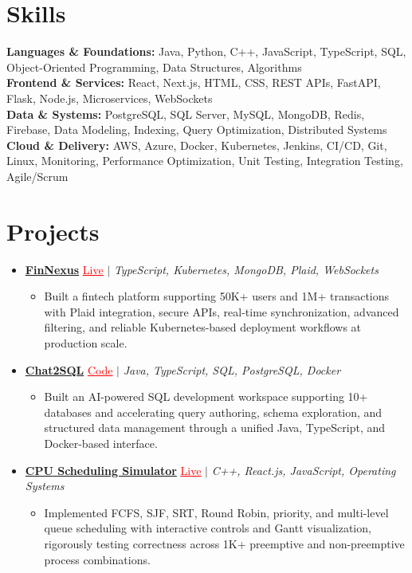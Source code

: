\documentclass[letterpaper,10pt]{article}
\newcommand{\itemTail}{\vspace{-5pt}}
\newcommand{\sectionGap}{\vspace{-8pt}}
\newcommand{\projGap}{\vspace{3pt}}
\newcommand{\resumeItem}[1]{\item\small{{#1 \itemTail}}}
\newcommand{\resumeProjectHeading}[1]{\item \small #1 \vspace{-2pt}}
\newcommand{\resumeProjectLink}[2]{\href{#1}{\textcolor{red}{\underline{#2}}}}
\newcommand{\resumeSubHeadingListStart}{\begin{itemize}[leftmargin=0.0in, label={}]}
\newcommand{\resumeSubHeadingListEnd}{\end{itemize}}
\newcommand{\resumeProjItemListStart}{\begin{itemize}[leftmargin=0.15in,label=\textbullet,itemsep=3pt,topsep=0pt,parsep=0pt,partopsep=0pt]}
\newcommand{\resumeProjItemListEnd}{\end{itemize}\vspace{-4pt}}
\begin{document}
\section{Skills}
\begin{itemize}[leftmargin=0.15in, label={}]
\small{\item{
\textbf{Languages \& Foundations:} Java, Python, C++, JavaScript, TypeScript, SQL, Object-Oriented Programming, Data Structures, Algorithms \\
\textbf{Frontend \& Services:} React, Next.js, HTML, CSS, REST APIs, FastAPI, Flask, Node.js, Microservices, WebSockets \\
\textbf{Data \& Systems:} PostgreSQL, SQL Server, MySQL, MongoDB, Redis, Firebase, Data Modeling, Indexing, Query Optimization, Distributed Systems \\
\textbf{Cloud \& Delivery:} AWS, Azure, Docker, Kubernetes, Jenkins, CI/CD, Git, Linux, Monitoring, Performance Optimization, Unit Testing, Integration Testing, Agile/Scrum
}}
\end{itemize}
\sectionGap
\section{Projects}
\resumeSubHeadingListStart
\vspace{-2pt}
\resumeProjectHeading{\href{https://fin-nexus.vercel.app/}{\textbf{FinNexus}} \resumeProjectLink{https://fin-nexus.vercel.app/}{Live} $|$ \emph{TypeScript, Kubernetes, MongoDB, Plaid, WebSockets}}
\resumeProjItemListStart
\resumeItem{Built a fintech platform supporting 50K+ users and 1M+ transactions with Plaid integration, secure APIs, real-time synchronization, advanced filtering, and reliable Kubernetes-based deployment workflows at production scale.}
\resumeProjItemListEnd
\projGap
\resumeProjectHeading{\href{https://github.com/SAHAJ-BHADJA/Chat2SQL}{\textbf{Chat2SQL}} \resumeProjectLink{https://github.com/SAHAJ-BHADJA/Chat2SQL}{Code} $|$ \emph{Java, TypeScript, SQL, PostgreSQL, Docker}}
\resumeProjItemListStart
\resumeItem{Built an AI-powered SQL development workspace supporting 10+ databases and accelerating query authoring, schema exploration, and structured data management through a unified Java, TypeScript, and Docker-based interface.}
\resumeProjItemListEnd
\projGap
\resumeProjectHeading{\href{https://cpu-scheduler-amber.vercel.app/}{\textbf{CPU Scheduling Simulator}} \resumeProjectLink{https://cpu-scheduler-amber.vercel.app/}{Live} $|$ \emph{C++, React.js, JavaScript, Operating Systems}}
\resumeProjItemListStart
\resumeItem{Implemented FCFS, SJF, SRT, Round Robin, priority, and multi-level queue scheduling with interactive controls and Gantt visualization, rigorously testing correctness across 1K+ preemptive and non-preemptive process combinations.}
\resumeProjItemListEnd
\resumeSubHeadingListEnd
\end{document}
